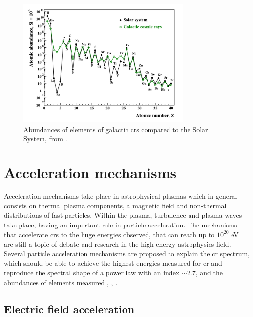 \documentclass[main.tex]{subfiles}
\begin{document}
    \begin{figure}
        \centering
        \includegraphics[width=0.77\textwidth]{Pictures/CRabundances.pdf}
        \caption{Abundances of elements of galactic \glspl{cr} compared to the Solar System, from \cite{2018particleacceleration}.}
        \label{fig:CRabundances}
    \end{figure}


\section{Acceleration mechanisms}

Acceleration mechanisms take place in astrophysical plasmas which in general consists on thermal plasma components, a magnetic field and non-thermal distributions of fast particles. Within the plasma, turbulence and plasma waves take place, having an important role in particle acceleration.
The mechanisms that accelerate \glspl{cr} to the huge energies observed, that can reach up to $10^{20}$ eV are still a topic of debate and research in the high energy astrophysics field. Several particle acceleration mechanisms are proposed to explain the \gls{cr} spectrum, which should be able to achieve the highest energies measured for \gls{cr} and reproduce the spectral shape of a power law with an index $\sim 2.7$, and the abundances of elements measured \cite{Hillas:1985is}, \cite{2008particleaccelerationmech}, \cite{2009accelerationmech}.

\subsection{Electric field acceleration}
\end{document}
